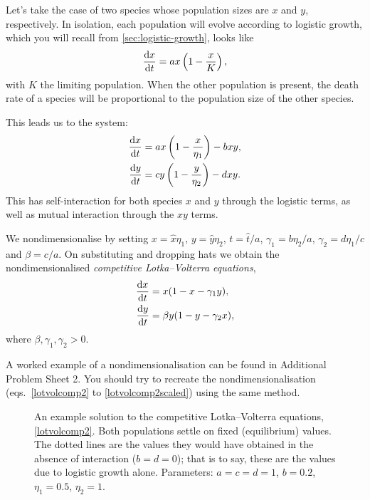 \documentclass[main.tex]{subfiles}
\begin{document}
Let’s take the case of two species whose population sizes are $x$ and $y$, respectively. In isolation, each population will evolve according to logistic growth, which you will recall from \cref{sec:logistic-growth}, looks like
\begin{equation}
\fd{x}{t} = a x\left(1-\frac{x}{K}\right),
\end{equation}
with $K$ the limiting population. When the other population is present, the death rate of a species will be proportional to the population size of the other species.

This leads us to the system:
\begin{subequations}
\label{lotvolcomp2}
\begin{align}
\fd{x}{t}  &= a x\left(1-\frac{x}{\eta_1}\right) - b x y,\\
\fd{y}{t}  &= c y\left(1-\frac{y}{\eta_2}\right) - d x y.
\end{align}
\end{subequations}
This has self-interaction for both species $x$ and $y$ through the logistic terms, as well as mutual interaction through the $xy$ terms. 

We nondimensionalise by setting $x = \hat{x}\eta_1$, $y = \hat{y}\eta_2$, $t = \hat{t}/a$, $\gamma_1 = b\eta_2/a$,  $\gamma_2 = d\eta_1/c$ and $\beta = c/a$. On substituting and dropping hats we obtain the nondimensionalised \emph{competitive Lotka--Volterra equations},
\begin{subequations}
\label{lotvolcomp2scaled}
\begin{align}
\fd{x}{t} &= x(1-x - \gamma_1 y),\\
\fd{y}{t} &= \beta y(1-y - \gamma_2 x),
\end{align}
\end{subequations}
where $\beta,\gamma_1,\gamma_2>0$.

\begin{do-it-yourself}
A worked example of a nondimensionalisation can be found in Additional Problem Sheet 2. You should try to recreate the nondimensionalisation (eqs.~\eqref{lotvolcomp2} to \eqref{lotvolcomp2scaled}) using the same method.
\end{do-it-yourself}

\begin{figure}
\centering

\caption{\label{lotcomp}An example solution to the competitive Lotka--Volterra equations, \cref{lotvolcomp2}.  Both populations settle on fixed (equilibrium) values. The dotted lines are the values they would have obtained in the absence of interaction ($b=d=0$); that is to say, these are the values due to logistic growth alone. Parameters: $a = c = d = 1$, $b=0.2$, $\eta_1 = 0.5$, $\eta_2 = 1$.}
\end{figure}
\end{document}
